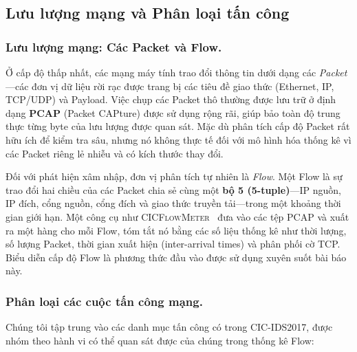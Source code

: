 \subsection{Lưu lượng mạng và Phân loại tấn công}
\label{sec:bg-network}

\subsubsection*{Lưu lượng mạng: Các Packet và Flow.}
Ở cấp độ thấp nhất, các mạng máy tính trao đổi thông tin dưới dạng các \emph{Packet}---các đơn vị dữ liệu rời rạc được trang bị các tiêu đề giao thức (Ethernet, IP, TCP/UDP) và Payload. Việc chụp các Packet thô thường được lưu trữ ở định dạng \textbf{PCAP} (Packet CAPture) được sử dụng rộng rãi, giúp bảo toàn độ trung thực từng byte của lưu lượng được quan sát. Mặc dù phân tích cấp độ Packet rất hữu ích để kiểm tra sâu, nhưng nó không thực tế đối với mô hình hóa thống kê vì các Packet riêng lẻ nhiễu và có kích thước thay đổi.

Đối với phát hiện xâm nhập, đơn vị phân tích tự nhiên là \emph{Flow}. Một Flow là sự trao đổi hai chiều của các Packet chia sẻ cùng một \textbf{bộ 5 (5-tuple)}---IP nguồn, IP đích, cổng nguồn, cổng đích và giao thức truyền tải---trong một khoảng thời gian giới hạn. Một công cụ như \textsc{CICFlowMeter}~\cite{ref_cicflowmeter} đưa vào các tệp PCAP và xuất ra một hàng cho mỗi Flow, tóm tắt nó bằng các số liệu thống kê như thời lượng, số lượng Packet, thời gian xuất hiện (inter-arrival times) và phân phối cờ TCP. Biểu diễn cấp độ Flow là phương thức đầu vào được sử dụng xuyên suốt bài báo này.

\subsubsection*{Phân loại các cuộc tấn công mạng.}
Chúng tôi tập trung vào các danh mục tấn công có trong CIC-IDS2017, được nhóm theo hành vi có thể quan sát được của chúng trong thống kê Flow:


